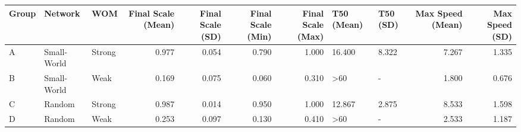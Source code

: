 \begin{tabular}{lllrrrrllrr}
\toprule
Group & Network & WOM & Final Scale (Mean) & Final Scale (SD) & Final Scale (Min) & Final Scale (Max) & T50 (Mean) & T50 (SD) & Max Speed (Mean) & Max Speed (SD) \\
\midrule
A & Small-World & Strong & 0.977 & 0.054 & 0.790 & 1.000 & 16.400 & 8.322 & 7.267 & 1.335 \\
B & Small-World & Weak & 0.169 & 0.075 & 0.060 & 0.310 & >60 & - & 1.800 & 0.676 \\
C & Random & Strong & 0.987 & 0.014 & 0.950 & 1.000 & 12.867 & 2.875 & 8.533 & 1.598 \\
D & Random & Weak & 0.253 & 0.097 & 0.130 & 0.410 & >60 & - & 2.533 & 1.187 \\
\bottomrule
\end{tabular}
